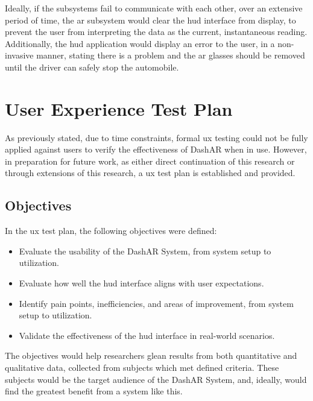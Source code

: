     \par Ideally, if the subsystems fail to communicate with each other, over an extensive period of time, the \gls{ar} subsystem would clear the \gls{hud} interface from display, to prevent the user from interpreting the data as the current, instantaneous reading. Additionally, the \gls{hud} application would display an error to the user, in a non-invasive manner, stating there is a problem and the \gls{ar} glasses should be removed until the driver can safely stop the automobile.

\section{User Experience Test Plan}
    \par As previously stated, due to time constraints, formal \gls{ux} testing could not be fully applied against users to verify the effectiveness of DashAR when in use. However, in preparation for future work, as either direct continuation of this research or through extensions of this research, a \gls{ux} test plan is established and provided.

    \subsection{Objectives}
        \par In the \gls{ux} test plan, the following objectives were defined:

        \begin{itemize}
            \item Evaluate the usability of the DashAR System, from system setup to utilization.
            \item Evaluate how well the \gls{hud} interface aligns with user expectations.
            \item Identify pain points, inefficiencies, and areas of improvement, from system setup to utilization.
            \item Validate the effectiveness of the \gls{hud} interface in real-world scenarios.
        \end{itemize}

        \par The objectives would help researchers glean results from both quantitative and qualitative data, collected from subjects which met defined criteria. These subjects would be the target audience of the DashAR System, and, ideally, would find the greatest benefit from a system like this.

